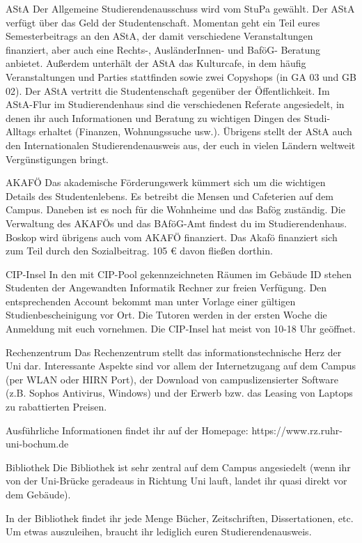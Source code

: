 AStA
Der Allgemeine Studierendenausschuss wird vom StuPa gewählt. Der AStA verfügt über das Geld der Studentenschaft. Momentan geht ein Teil eures Semesterbeitrags an den AStA, der damit verschiedene Veranstaltungen finanziert, aber auch eine Rechts-, AusländerInnen- und BaföG- Beratung anbietet. Außerdem unterhält der AStA das Kulturcafe, in dem häufig Veranstaltungen und Parties stattfinden sowie zwei Copyshops (in GA 03 und GB 02). Der AStA vertritt die Studentenschaft gegenüber der Öffentlichkeit. Im AStA-Flur im Studierendenhaus sind die verschiedenen Referate angesiedelt, in denen ihr auch Informationen und Beratung zu wichtigen Dingen des Studi-Alltags erhaltet (Finanzen, Wohnungssuche usw.). Übrigens stellt der AStA auch den Internationalen Studierendenausweis aus, der euch in vielen Ländern weltweit Vergünstigungen bringt.

AKAFÖ
Das akademische Förderungswerk kümmert sich um die wichtigen Details des Studentenlebens. Es betreibt die Mensen und Cafeterien auf dem Campus. Daneben ist es noch für die Wohnheime und das Bafög zuständig. Die Verwaltung des AKAFÖs und das BAföG-Amt findest du im Studierendenhaus. Boskop wird übrigens auch vom AKAFÖ finanziert. Das Akafö finanziert sich zum Teil durch den Sozialbeitrag. 105 € davon fließen dorthin.

CIP-Insel
In den mit CIP-Pool gekennzeichneten Räumen im Gebäude ID stehen Studenten der Angewandten Informatik Rechner zur freien Verfügung. Den entsprechenden Account bekommt man unter Vorlage einer gültigen Studienbescheinigung vor Ort. Die Tutoren werden in der ersten Woche die Anmeldung mit euch vornehmen. Die CIP-Insel hat meist von 10-18 Uhr geöffnet.

Rechenzentrum
Das Rechenzentrum stellt das informationstechnische Herz der Uni dar. Interessante Aspekte sind vor allem der Internetzugang auf dem Campus (per WLAN oder HIRN Port), der Download von campuslizensierter Software (z.B. Sophos Antivirus, Windows) und der Erwerb bzw. das Leasing von Laptops zu rabattierten Preisen.

Ausführliche Informationen findet ihr auf der Homepage: https://www.rz.ruhr-uni-bochum.de

Bibliothek
Die Bibliothek ist sehr zentral auf dem Campus angesiedelt (wenn ihr von der Uni-Brücke geradeaus in Richtung Uni lauft, landet ihr quasi direkt vor dem Gebäude). 

In der Bibliothek findet ihr jede Menge Bücher, Zeitschriften, Dissertationen, etc. Um etwas auszuleihen, braucht ihr lediglich euren Studierendenausweis. 

